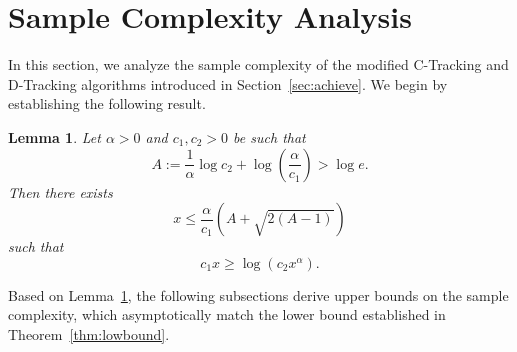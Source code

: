 \documentclass[final]{IEEEtran}
\newtheorem{lemma}[theorem]{Lemma}
\begin{document}
\section{Sample Complexity Analysis}
In this section, we analyze the sample complexity of the modified C-Tracking and D-Tracking algorithms introduced in Section~\ref{sec:achieve}. We begin by establishing the following result.
\begin{lemma} \label{easy:lem} 
Let \( \alpha > 0 \) and \( c_1, c_2 > 0 \) be such that
\[
A := \frac{1}{\alpha} \log c_2 + \log \left( \frac{\alpha}{c_1} \right) > \log e.
\]
Then there exists
\[
x \leq \frac{\alpha}{c_1} \left( A + \sqrt{2(A - 1)} \right)
\]
such that
\[
c_1 x \geq \log(c_2 x^{\alpha}).
\]
\end{lemma}
Based on Lemma~\ref{easy:lem}, the following subsections derive upper bounds on the sample complexity, which asymptotically match the lower bound established in Theorem~\ref{thm:lowbound}. 
\end{document}
